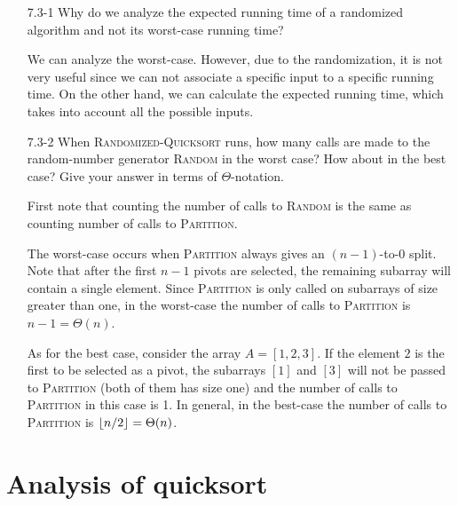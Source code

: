 \begin{enumerate}

\item[7.3{-}1]{Why do we analyze the expected running time of a randomized
algorithm and not its worst-case running time?}

\begin{framed}
We can analyze the worst-case. However, due to the randomization, it is not very
useful since we can not associate a specific input to a specific running time.
On the other hand, we can calculate the expected running time, which takes into
account all the possible inputs.
\end{framed}

\item[7.3{-}2]{When \textsc{Randomized-Quicksort} runs, how many calls are made
to the random-number generator \textsc{Random} in the worst case? How about in the
best case? Give your answer in terms of $\Theta$-notation.}

\begin{framed}
First note that counting the number of calls to \textsc{Random} is the same as
counting number of calls to \textsc{Partition}.

The worst-case occurs when \textsc{Partition} always gives an $(n - 1)$-to-0
split. Note that after the first $n - 1$ pivots are selected, the remaining
subarray will contain a single element. Since \textsc{Partition} is only called
on subarrays of size greater than one, in the worst-case the number of calls to
\textsc{Partition} is $n - 1 = \Theta(n)$.

As for the best case, consider the array $A = [1, 2, 3]$. If the element $2$ is
the first to be selected as a pivot, the subarrays $[1]$ and $[3]$ will not be
passed to \textsc{Partition} (both of them has size one) and the number of calls
to \textsc{Partition} in this case is 1. In general, in the best-case the number
of calls to \textsc{Partition} is $\lfloor n/2\rfloor = \Theta(n)$.
\end{framed}

\end{enumerate}

\newpage

\section{Analysis of quicksort}


